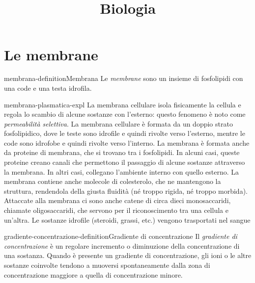 \documentclass[preview]{standalone}
\begin{document}
\title{Biologia}
\genpage

\section{Le membrane}



\begin{snippetdefinition}{membrana-definition}{Membrana}
    Le \textit{membrane} sono un insieme di fosfolipidi con una code e una testa idrofila.
\end{snippetdefinition}

\begin{snippet}{membrana-plasmatica-expl}
    La membrana cellulare isola fisicamente la cellula e regola lo scambio di alcune sostanze
    con l'esterno: questo fenomeno è noto come \textit{permeabilità selettiva}. La membrana cellulare
    è formata da un doppio strato fosfolipidico, dove le teste sono idrofile e quindi rivolte verso
    l'esterno, mentre le code sono idrofobe e quindi rivolte verso l'interno. La membrana è
    formata anche da proteine di membrana, che si trovano tra i fosfolipidi. In alcuni casi, queste
    proteine creano canali che permettono il passaggio di alcune sostanze attraverso la
    membrana. In altri casi, collegano l'ambiente interno con quello esterno. La membrana
    contiene anche molecole di colesterolo, che ne mantengono la struttura, rendendola della
    giusta fluidità (né troppo rigida, né troppo morbida). Attaccate alla membrana ci sono anche
    catene di circa dieci monosaccaridi, chiamate oligosaccaridi, che servono per il
    riconoscimento tra una cellula e un'altra.
    Le sostanze idrofile (steroidi, grassi, etc.) vengono trasportati nel sangue
\end{snippet}

\begin{snippetdefinition}{gradiente-concentrazione-definition}{Gradiente di concentrazione}
    Il \textit{gradiente di concentrazione} è un regolare incremento o diminuzione della concentrazione di una sostanza. Quando è presente un gradiente di concentrazione, gli ioni o le altre sostanze coinvolte tendono a muoversi spontaneamente dalla zona di concentrazione maggiore a quella di concentrazione minore.
\end{snippetdefinition}
\end{document}

